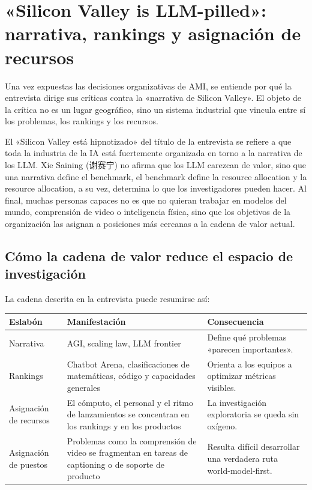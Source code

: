 \section{«Silicon Valley is LLM-pilled»: narrativa, rankings y asignación de recursos}

Una vez expuestas las decisiones organizativas de AMI, se entiende por qué la entrevista dirige sus críticas contra la «narrativa de Silicon Valley». El objeto de la crítica no es un lugar geográfico, sino un sistema industrial que vincula entre sí los problemas, los rankings y los recursos.

El «Silicon Valley está hipnotizado» del título de la entrevista se refiere a que toda la industria de la IA está fuertemente organizada en torno a la narrativa de los LLM. Xie Saining (谢赛宁) no afirma que los LLM carezcan de valor, sino que una narrativa define el benchmark, el benchmark define la resource allocation y la resource allocation, a su vez, determina lo que los investigadores pueden hacer. Al final, muchas personas capaces no es que no quieran trabajar en modelos del mundo, comprensión de video o inteligencia física, sino que los objetivos de la organización las asignan a posiciones más cercanas a la cadena de valor actual.

\subsection{Cómo la cadena de valor reduce el espacio de investigación}

La cadena descrita en la entrevista puede resumirse así:

\begin{center}
\begin{tabularx}{0.95\textwidth}{p{}p{}X}
\toprule
Eslabón & Manifestación & Consecuencia \\
\midrule
Narrativa & AGI, scaling law, LLM frontier & Define qué problemas «parecen importantes». \\
Rankings & Chatbot Arena, clasificaciones de matemáticas, código y capacidades generales & Orienta a los equipos a optimizar métricas visibles. \\
Asignación de recursos & El cómputo, el personal y el ritmo de lanzamientos se concentran en los rankings y en los productos & La investigación exploratoria se queda sin oxígeno. \\
Asignación de puestos & Problemas como la comprensión de video se fragmentan en tareas de captioning o de soporte de producto & Resulta difícil desarrollar una verdadera ruta world-model-first. \\
\bottomrule
\end{tabularx}
\end{center}

